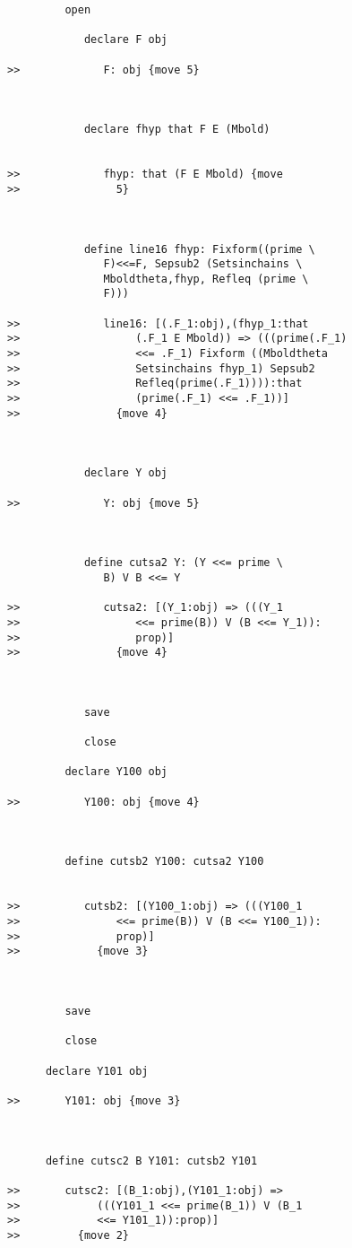 \documentclass[12pt]{article}
\begin{document}
\begin{verbatim}
         open

            declare F obj

>>             F: obj {move 5}



            declare fhyp that F E (Mbold)


>>             fhyp: that (F E Mbold) {move
>>               5}



            define line16 fhyp: Fixform((prime \
               F)<<=F, Sepsub2 (Setsinchains \
               Mboldtheta,fhyp, Refleq (prime \
               F)))

>>             line16: [(.F_1:obj),(fhyp_1:that
>>                  (.F_1 E Mbold)) => (((prime(.F_1)
>>                  <<= .F_1) Fixform ((Mboldtheta
>>                  Setsinchains fhyp_1) Sepsub2
>>                  Refleq(prime(.F_1)))):that
>>                  (prime(.F_1) <<= .F_1))]
>>               {move 4}



            declare Y obj

>>             Y: obj {move 5}



            define cutsa2 Y: (Y <<= prime \
               B) V B <<= Y

>>             cutsa2: [(Y_1:obj) => (((Y_1
>>                  <<= prime(B)) V (B <<= Y_1)):
>>                  prop)]
>>               {move 4}



            save

            close

         declare Y100 obj

>>          Y100: obj {move 4}



         define cutsb2 Y100: cutsa2 Y100


>>          cutsb2: [(Y100_1:obj) => (((Y100_1
>>               <<= prime(B)) V (B <<= Y100_1)):
>>               prop)]
>>            {move 3}



         save

         close

      declare Y101 obj

>>       Y101: obj {move 3}



      define cutsc2 B Y101: cutsb2 Y101

>>       cutsc2: [(B_1:obj),(Y101_1:obj) =>
>>            (((Y101_1 <<= prime(B_1)) V (B_1
>>            <<= Y101_1)):prop)]
>>         {move 2}




\end{verbatim}
\end{document}
